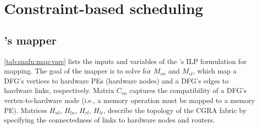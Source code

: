 \chapter{Constraint-based scheduling} 
\label{chapter:map}

\section{\snafu's mapper}
\label{appendix:snafu:ilp}
% 

\begin{table}[h]
  \centering

  \caption{Inputs \& variables of \snafu's ILP formulation.}
  \label{tab:snafu:map:vars}
\end{table}	

\autoref{tab:snafu:map:vars} lists the inputs and variables of the \snafu's ILP formulation for mapping.
% 
The goal of the mapper is to solve for $M_{vn}$ and $M_{el}$, which map a DFG's vertices to hardware PEs (hardware nodes) and a DFG's edges to hardware links, respectively.
% 
Matrix $C_{vn}$ captures the compatibility of a DFG's vertex-to-hardware node (i.e., a memory operation must be mapped to a memory PE).
% 
Matrices $H_{nl}$, $H_{ln}$, $H_{rl}$, $H_{lr}$, describe the topology of the CGRA fabric by specifying the connectedness of links to hardware nodes and routers.

